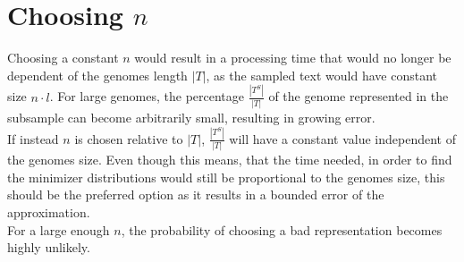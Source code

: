 \documentclass[a4paper,titlepage,onecolumn,oneside,12pt,nenglish,titlepage=firstiscover]{scrbook}
\theoremstyle{plain} %
\theoremstyle{definition} %
\theoremstyle{remark} %
\theoremstyle{plain}
\newcommand{\numberOfSamples}{n}
\newcommand{\lengthOfSamples}{l}
\newcommand{\genomeText}{T}
\newcommand{\sampledText}{T^S}
\begin{document}
\section{Choosing $\numberOfSamples$}
Choosing a constant $\numberOfSamples$ would result in a processing time that would no longer be dependent of the genomes length $|\genomeText|$, as the sampled text would have constant size $\numberOfSamples \cdot \lengthOfSamples$. For large genomes, the percentage $\frac{|\sampledText|}{|\genomeText|}$ of the genome represented in the subsample can become arbitrarily small, resulting in growing error.\\
If instead $\numberOfSamples$ is chosen relative to $|\genomeText|$, $\frac{|\sampledText|}{|\genomeText|}$ will have a constant value independent of the genomes size. Even though this means, that the time needed, in order to find the minimizer distributions would still be proportional to the genomes size, this should be the preferred option as it results in a bounded error of the approximation.
\\
For a large enough $\numberOfSamples$, the probability of choosing a bad representation becomes highly unlikely.\\
\end{document}
